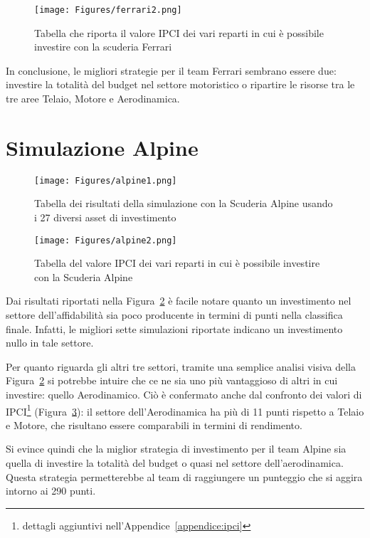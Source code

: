 \begin{figure}[h]
    \centering
    \texttt{[image: Figures/ferrari2.png]} %
    \caption{Tabella che riporta il valore IPCI dei vari reparti in cui è possibile investire con la scuderia Ferrari}
    \label{fig:ipci}
\end{figure}

In conclusione, le migliori strategie per il team Ferrari sembrano essere due: investire la totalità del budget nel settore motoristico o ripartire le risorse tra le tre aree Telaio, Motore e Aerodinamica.

\newpage

\section{Simulazione Alpine}

\begin{figure}[h]
    \centering
    \texttt{[image: Figures/alpine1.png]}
    \caption{Tabella dei risultati della simulazione con la Scuderia Alpine usando i 27 diversi asset di investimento}
    \label{fig:figura9_5}
\end{figure}

\begin{figure}[h]
    \centering
    \texttt{[image: Figures/alpine2.png]}
    \caption{Tabella del valore IPCI dei vari reparti in cui è possibile investire con la Scuderia Alpine}
    \label{fig:figura9_6}
\end{figure}

Dai risultati riportati nella Figura~\ref{fig:figura9_5} è facile notare quanto un investimento nel settore dell’affidabilità sia poco producente in termini di punti nella classifica finale. Infatti, le migliori sette simulazioni riportate indicano un investimento nullo in tale settore.

Per quanto riguarda gli altri tre settori, tramite una semplice analisi visiva della Figura~\ref{fig:figura9_5} si potrebbe intuire che ce ne sia uno più vantaggioso di altri in cui investire: quello Aerodinamico. Ciò è confermato anche dal confronto dei valori di IPCI\footnote{dettagli aggiuntivi nell'Appendice~\ref{appendice:ipci}} (Figura~\ref{fig:figura9_6}): il settore dell’Aerodinamica ha più di 11 punti rispetto a Telaio e Motore, che risultano essere comparabili in termini di rendimento.

Si evince quindi che la miglior strategia di investimento per il team Alpine sia quella di investire la totalità del budget o quasi nel settore dell’aerodinamica. Questa strategia permetterebbe al team di raggiungere un punteggio che si aggira intorno ai 290 punti.

